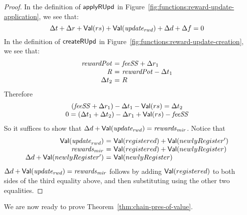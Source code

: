 \begin{proof}
  In the definition of $\mathsf{applyRUpd}$ in Figure~\ref{fig:functions:reward-update-application},
  we see that:
  \begin{equation*}
      \Delta t + \Delta r + \mathsf{Val}(rs) + \mathsf{Val}(\mathit{update_{rwd}}) + \Delta d + \Delta f = 0
  \end{equation*}
  In the definition of $\mathsf{createRUpd}$ in Figure~\ref{fig:functions:reward-update-creation},
  we see that:
  \begin{equation*}
    \begin{array}{r@{~=~}l}
      \var{rewardPot} & \var{feeSS} + \Delta r_1 \\
      \var{R} & \var{rewardPot} - \Delta t_1 \\
      \Delta t_2 & R \\
    \end{array}
  \end{equation*}
  Therefore
  \begin{equation*}
    \begin{array}{c}
      (\mathit{feeSS} + \Delta r_1) - \Delta t_1 - \mathsf{Val}(rs) = \Delta t_2 \\
      0 = (\Delta t_1 + \Delta t_2 ) - \Delta r_1 + \mathsf{Val}(rs)- \mathit{feeSS} \\
    \end{array}
  \end{equation*}
  So it suffices to show that $\Delta d + \mathsf{Val}(\mathit{update_{rwd}}) = \mathit{rewards}_{\mathit{mir}}$.
  Notice that
  \begin{equation*}
    \begin{array}{r@{~=~}l}
      \Val(\var{update}_{rwd}) & \Val(registered) + \Val(newlyRegister')
      \\
      \var{rewards}_{mir} & \Val(registered) + \Val(newlyRegister)
      \\
      \Delta d + \Val(newlyRegister') & \Val(newlyRegister)
    \end{array}
  \end{equation*}
  $\Delta d + \mathsf{Val}(\mathit{update_{rwd}}) = \mathit{rewards}_{\mathit{mir}}$
  follows by adding $\mathsf{Val}(registered)$ to both sides of the third
  equality above, and then substituting using the other two equalities.
\end{proof}

\noindent
We are now ready to prove Theorem~\ref{thm:chain-pres-of-value}.

